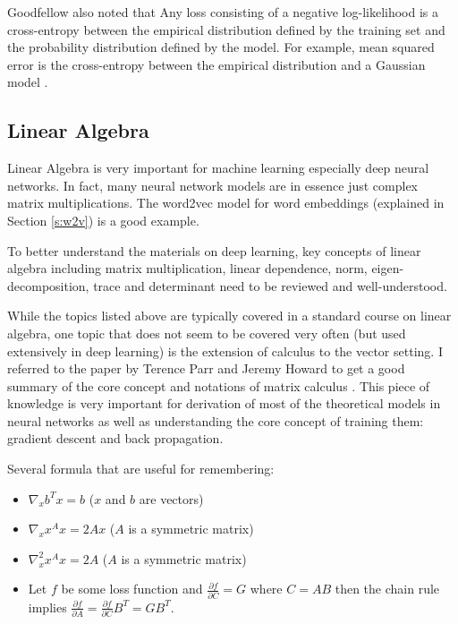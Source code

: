 \documentclass[11pt]{article}
\theoremstyle{plain}
\begin{document}
Goodfellow also noted that Any loss consisting of a negative log-likelihood is 
a cross-entropy between the empirical distribution defined by the training set 
and the probability distribution defined by the model. For example, mean 
squared error is the cross-entropy between the empirical distribution and a 
Gaussian model \cite{Goodfellow-et-al-2016}. 

\subsection{Linear Algebra}

Linear Algebra is very important for machine learning especially deep neural 
networks. In fact, many neural network models are in essence just complex 
matrix multiplications. The word2vec model for word embeddings (explained 
in Section \ref{s:w2v}) is a good example. 

To better understand the materials on deep learning, key concepts of linear 
algebra including matrix multiplication, linear dependence, norm, 
eigen-decomposition, trace and determinant need to be reviewed and 
well-understood. 

While the topics listed above are typically covered in a standard course on 
linear algebra, one topic that does not seem to be covered very often (but 
used extensively in deep learning) is the extension of calculus to the vector 
setting. I referred to the paper by Terence Parr and Jeremy Howard to get a 
good summary of the core concept and notations of matrix calculus 
\cite{DBLP:journals/corr/abs-1802-01528}. This piece of knowledge is very 
important for derivation of most of the theoretical models in neural networks 
as well as understanding the core concept of training them: gradient 
descent and back propagation. 

Several formula that are useful for remembering:
\begin{itemize}
	\item $\nabla_x b^{T}x = b$ ($x$ and $b$ are vectors)
	\item $\nabla_x x^{A}x = 2Ax$ ($A$ is a symmetric matrix)
	\item $\nabla_x^2 x^{A}x = 2A$ ($A$ is a symmetric matrix)
	\item Let $f$ be some loss function and $\frac{\partial f}{\partial C}=G$ 
	where $C=AB$ then the chain rule implies $\frac{\partial f}{\partial 
	A}=\frac{\partial f}{\partial C}B^{T}=GB^{T}$. 
\end{itemize}
\end{document}
